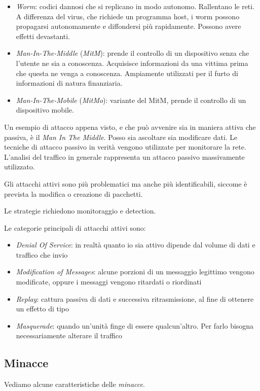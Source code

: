 \documentclass[14pt]{extreport}
\begin{document}
\begin{itemize}
    \item \textit{Worm}: codici dannosi che si replicano in modo autonomo. Rallentano le reti. A differenza del virus, che richiede un programma host, i worm possono propagarsi autonomamente e diffondersi più rapidamente. Possono avere effetti devastanti.
    
    
    \item \textit{Man-In-The-Middle} (\textit{MitM}): prende il controllo di un dispositivo senza che l'utente ne sia a conoscenza. Acquisisce informazioni da una vittima prima che questa ne venga a conoscenza. Ampiamente utilizzati per il furto di informazioni di natura finanziaria.
    
    \item \textit{Man-In-The-Mobile} (\textit{MitMo}): variante del MitM, prende il controllo di un dispositivo mobile.
\end{itemize}

Un esempio di attacco appena visto, e che può avvenire sia in maniera attiva che passiva, è il \textit{Man In The Middle}. Posso sia ascoltare sia modificare dati.
Le tecniche di attacco passivo in verità vengono utilizzate per monitorare la rete. L'analisi del traffico in generale rappresenta un attacco passivo massivamente utilizzato.

Gli attacchi attivi sono più problematici ma anche più identificabili, siccome è prevista la modifica o creazione di pacchetti.

Le strategie richiedono monitoraggio e detection.

Le categorie principali di attacchi attivi sono:

\begin{itemize}
    \item \textit{Denial Of Service}: in realtà quanto io sia attivo dipende dal volume di dati e traffico che invio
    \item \textit{Modification of Messages}: alcune porzioni di un messaggio legittimo vengono modificate, oppure i messaggi vengono ritardati o riordinati
    \item \textit{Replay}: cattura passiva di dati e successiva ritrasmissione, al fine di ottenere un effetto di tipo 
    \item \textit{Masquerade}: quando un'unità finge di essere qualcun'altro. Per farlo bisogna necessariamente alterare il traffico
\end{itemize}


\subsection{Minacce}
Vediamo alcune caratteristiche delle \textit{minacce}.
\end{document}
